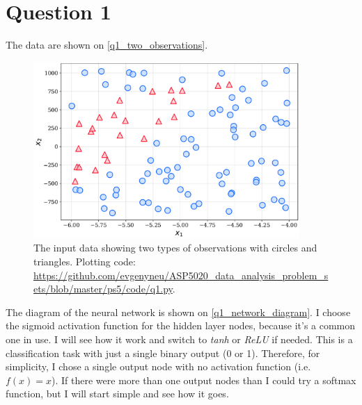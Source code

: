 \section{Question 1}

The data are shown on \autoref{q1_two_observations}.

\begin{figure}[!ht]
  \centering
  \includegraphics[width=0.9\textwidth]{figures/q1.pdf}
  \caption{The input data showing two types of observations with circles and triangles. Plotting code: \url{https://github.com/evgenyneu/ASP5020_data_analysis_problem_sets/blob/master/ps5/code/q1.py}.}
  \label{q1_two_observations}
\end{figure}

The diagram of the neural network is shown on \autoref{q1_network_diagram}. I choose the sigmoid activation function for the hidden layer nodes, because it's a common one in use. I will see how it work and switch to \emph{tanh} or \emph{ReLU} if needed. This is a classification task with just a single binary output (0 or 1). Therefore, for simplicity, I chose a single output node with no activation function (i.e. $f(x) = x$). If there were more than one output nodes than I could try a softmax function, but I will start simple and see how it goes.

